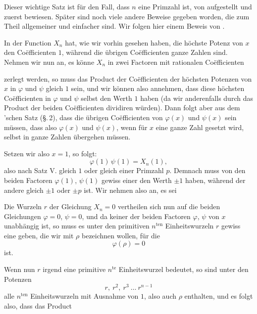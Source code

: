 
Dieser wichtige Satz ist für den Fall, dass $n$ eine Primzahl ist, von
 aufgestellt und zuerst bewiesen. Später sind noch viele
andere Beweise gegeben worden, die zum Theil allgemeiner und einfacher sind.
Wir folgen hier einem Beweis von .

In der Function $X_n$ hat, wie wir vorhin gesehen haben, die höchste Potenz
von $x$ den Co\"efficienten $1$, während die übrigen Co\"efficienten ganze
Zahlen sind. Nehmen wir nun an, es könne $X_n$ in zwei Factoren mit
rationalen Co\"efficienten


zerlegt werden, so muss das Product der Co\"efficienten der höchsten Potenzen
von $x$ in $\varphi$ und $\psi$ gleich $1$ sein, und wir können also
annehmen, dass diese höchsten Co\"efficienten in $\varphi$ und $\psi$ selbst
den Werth $1$ haben (da wir anderenfalls durch das Product der beiden
Co\"efficienten dividiren würden). Dann folgt aber aus dem
'schen Satz (\S.\,2), dass die übrigen Co\"efficienten von
$\varphi(x)$ und $\psi(x)$  sein müssen, dass also $\varphi(x)$
und $\psi(x)$, wenn für $x$ eine ganze Zahl gesetzt wird, selbst in ganze
Zahlen übergehen müssen.

Setzen wir also $x = 1$, so folgt:
\[
\varphi(1)\,\psi(1) = X_n(1),
\]
also nach Satz V. gleich $1$ oder gleich einer Primzahl $p$. Demnach muss von
den beiden Factoren $\varphi(1)$, $\psi(1)$ gewiss einer den Werth $\pm 1$
haben, während der andere gleich $\pm 1$ oder $\pm p$ ist. Wir nehmen also
an, es sei


Die Wurzeln $r$ der Gleichung $X_n = 0$ vertheilen sich nun auf die beiden
Gleichungen $\varphi = 0$, $\psi = 0$, und da keiner der beiden Factoren
$\varphi$, $\psi$ von $x$ unabhängig ist, so muss es unter den primitiven
$n^{\mathrm{ten}}$ Einheitswurzeln $r$ gewiss eine geben, die wir mit $\rho$
bezeichnen wollen, für die
\[
\varphi(\rho) = 0
\]
ist.

Wenn nun $r$ irgend eine primitive $n^{\mathrm{te}}$ Einheitswurzel
bedeutet, so sind unter den Potenzen
\[
r,\ r^2,\ r^3\ \dots\ r^{n-1}
\]
alle $n^{\mathrm{ten}}$ Einheitswurzeln mit Ausnahme von $1$, also auch
$\rho$ enthalten, und es folgt also, dass das Product
